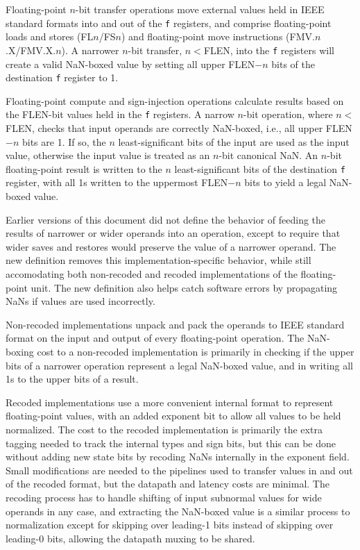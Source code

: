 Floating-point $n$-bit transfer operations move external values held
in IEEE standard formats into and out of the {\tt f} registers, and
comprise floating-point loads and stores (FL$n$/FS$n$) and
floating-point move instructions (FMV.$n$.X/FMV.X.$n$).  A narrower
$n$-bit transfer, $n<$FLEN, into the {\tt f} registers will create a
valid NaN-boxed value by setting all upper FLEN$-n$ bits of the
destination {\tt f} register to 1.

Floating-point compute and sign-injection operations calculate results
based on the FLEN-bit values held in the {\tt f} registers.  A narrow
$n$-bit operation, where $n<$FLEN, checks that input operands are
correctly NaN-boxed, i.e., all upper FLEN$-n$ bits are 1.  If so, the
$n$ least-significant bits of the input are used as the input value,
otherwise the input value is treated as an $n$-bit canonical NaN.  An
$n$-bit floating-point result is written to the $n$ least-significant
bits of the destination {\tt f} register, with all 1s written to the
uppermost FLEN$-n$ bits to yield a legal NaN-boxed value.

\begin{commentary}
Earlier versions of this document did not define the behavior of
feeding the results of narrower or wider operands into an operation,
except to require that wider saves and restores would preserve the
value of a narrower operand.  The new definition removes this
implementation-specific behavior, while still accomodating both
non-recoded and recoded implementations of the floating-point unit.
The new definition also helps catch software errors by propagating
NaNs if values are used incorrectly.

Non-recoded implementations unpack and pack the operands to IEEE
standard format on the input and output of every floating-point
operation.  The NaN-boxing cost to a non-recoded implementation is
primarily in checking if the upper bits of a narrower operation
represent a legal NaN-boxed value, and in writing all 1s to the upper
bits of a result.

Recoded implementations use a more convenient internal format to
represent floating-point values, with an added exponent bit to allow
all values to be held normalized.  The cost to the recoded
implementation is primarily the extra tagging needed to track the
internal types and sign bits, but this can be done without adding new
state bits by recoding NaNs internally in the exponent field.  Small
modifications are needed to the pipelines used to transfer values in
and out of the recoded format, but the datapath and latency costs are
minimal.  The recoding process has to handle shifting of input
subnormal values for wide operands in any case, and extracting the
NaN-boxed value is a similar process to normalization except for
skipping over leading-1 bits instead of skipping over leading-0 bits,
allowing the datapath muxing to be shared.
\end{commentary}


